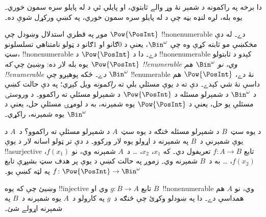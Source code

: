 \documentclass[../../../include/open-logic-section]{subfiles}
\begin{document}


\begin{editorial}
  دا برخه په راکمونه د شمېر نۀ وړ والے ثابتوي، او پايلې ئې د
   له پايلو سره سمون خوري۔ يوه بله، لږه لنډه
  بڼه چې د  له پايلو سره سمون خوري، په
   کښې ورکړل شوې ده۔
\end{editorial}

موږ په قطري استدلال وښودل چې $\Pow{\PosInt}$ !!{nonenumerable}
دے۔ له دې مخکښې مو ثابته کړې وه چې $\Bin^\omega$، يعنې د
$0$ګانو او $1$ګانو د ټولو نامتناهي تسلسلونو سټ،
!!{nonenumerable} دے۔ دا د $\Pow{\PosInt}$ د !!{nonenumerable}
کېدو د ثابتولو يوه بله لار ده: وښيئ چې \emph{که $\Pow{\PosInt}$
!!{enumerable} وي، نو $\Bin^\omega$ هم !!{enumerable} دے}۔ ځکه
پوهېږو چې $\Bin^\omega$ !!{enumerable} نۀ دے، $\Pow{\PosInt}$
هم داسې نۀ شي کېدے۔ دې ته د يوې مسئلې بلې ته \emph{راکمونه}
ويل کېږي؛ په دې حالت کښې د $\Bin^\omega$ د شمېرلو مسئله د
$\Pow{\PosInt}$ د شمېرلو مسئلې ته راکموو۔ د وروستۍ مسئلې يو حل،
يعنې د $\Pow{\PosInt}$ يوه شمېرنه، به د لومړۍ مسئلې حل، يعنې د
$\Bin^\omega$ يوه شمېرنه، راکړي۔

د يوه سټ~$B$ د شمېرلو مسئله څنګه د يوه سټ~$A$ د شمېرلو مسئلې
ته راکموو؟ د~$A$ د يوې شمېرنې د~$B$ په شمېرنه د اړولو يوه لار
ورکوو۔ د دې تر ټولو اسانه لار د يوې !!a{surjective} تابع
$f\colon A \to B$ تعريفول دي۔ که $x_1$، $x_2$، \dots{} د~$A$
شمېرنه وي، نو $f(x_1)$، $f(x_2)$، \dots{} به د~$B$ شمېرنه وي۔
زموږ په حالت کښې د يوې پر هدف سټ بشپړې تابع
$f\colon \Pow{\PosInt} \to \Bin^\omega$ په لټه کښې يو۔

\begin{prob}
وښيئ چې که يوه !!{injective} تابع $g\colon B \to A$ وي او
$B$~!!{nonenumerable} وي، نو $A$ هم همداسې دے۔ دا په ښودلو
وکړئ چې څنګه د~$g$ په کارولو د~$A$ يوه شمېرنه د~$B$ په شمېرنه
اړولے شئ۔
\end{prob}
\end{document}
